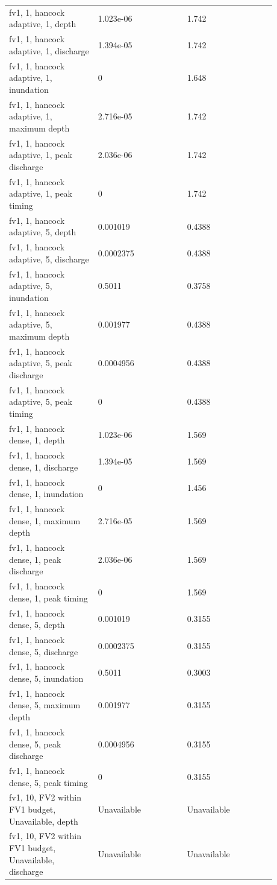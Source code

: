 \begin{longtable}{p{0.2933\linewidth}p{0.2933\linewidth}p{0.2933\linewidth}}
fv1, 1, hancock adaptive, 1, depth & 1.023e-06 & 1.742 \\
fv1, 1, hancock adaptive, 1, discharge & 1.394e-05 & 1.742 \\
fv1, 1, hancock adaptive, 1, inundation & 0 & 1.648 \\
fv1, 1, hancock adaptive, 1, maximum depth & 2.716e-05 & 1.742 \\
fv1, 1, hancock adaptive, 1, peak discharge & 2.036e-06 & 1.742 \\
fv1, 1, hancock adaptive, 1, peak timing & 0 & 1.742 \\
fv1, 1, hancock adaptive, 5, depth & 0.001019 & 0.4388 \\
fv1, 1, hancock adaptive, 5, discharge & 0.0002375 & 0.4388 \\
fv1, 1, hancock adaptive, 5, inundation & 0.5011 & 0.3758 \\
fv1, 1, hancock adaptive, 5, maximum depth & 0.001977 & 0.4388 \\
fv1, 1, hancock adaptive, 5, peak discharge & 0.0004956 & 0.4388 \\
fv1, 1, hancock adaptive, 5, peak timing & 0 & 0.4388 \\
fv1, 1, hancock dense, 1, depth & 1.023e-06 & 1.569 \\
fv1, 1, hancock dense, 1, discharge & 1.394e-05 & 1.569 \\
fv1, 1, hancock dense, 1, inundation & 0 & 1.456 \\
fv1, 1, hancock dense, 1, maximum depth & 2.716e-05 & 1.569 \\
fv1, 1, hancock dense, 1, peak discharge & 2.036e-06 & 1.569 \\
fv1, 1, hancock dense, 1, peak timing & 0 & 1.569 \\
fv1, 1, hancock dense, 5, depth & 0.001019 & 0.3155 \\
fv1, 1, hancock dense, 5, discharge & 0.0002375 & 0.3155 \\
fv1, 1, hancock dense, 5, inundation & 0.5011 & 0.3003 \\
fv1, 1, hancock dense, 5, maximum depth & 0.001977 & 0.3155 \\
fv1, 1, hancock dense, 5, peak discharge & 0.0004956 & 0.3155 \\
fv1, 1, hancock dense, 5, peak timing & 0 & 0.3155 \\
fv1, 10, FV2 within FV1 budget, Unavailable, depth & Unavailable & Unavailable \\
fv1, 10, FV2 within FV1 budget, Unavailable, discharge & Unavailable & Unavailable \\

\end{longtable}
